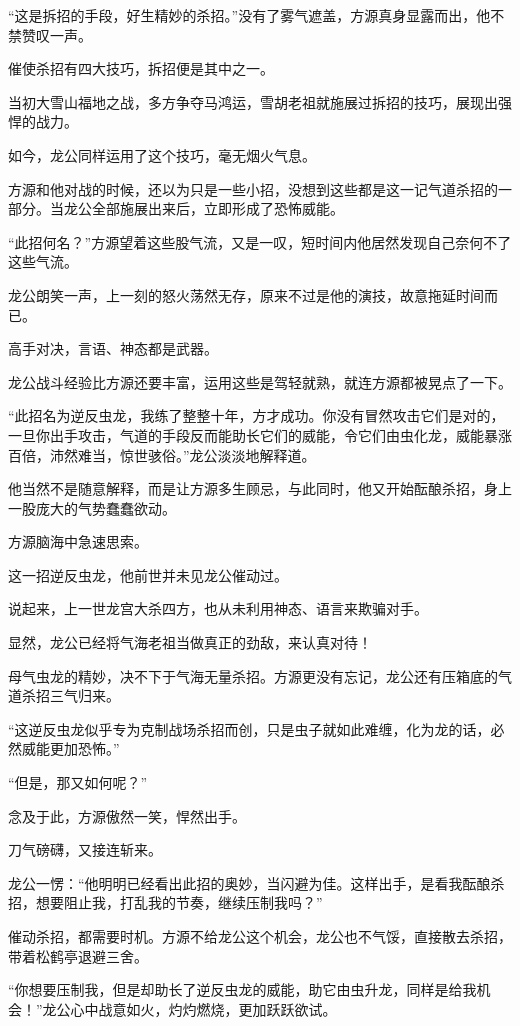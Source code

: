 \begin{this_body}
“这是拆招的手段，好生精妙的杀招。”没有了雾气遮盖，方源真身显露而出，他不禁赞叹一声。

催使杀招有四大技巧，拆招便是其中之一。

当初大雪山福地之战，多方争夺马鸿运，雪胡老祖就施展过拆招的技巧，展现出强悍的战力。

如今，龙公同样运用了这个技巧，毫无烟火气息。

方源和他对战的时候，还以为只是一些小招，没想到这些都是这一记气道杀招的一部分。当龙公全部施展出来后，立即形成了恐怖威能。

“此招何名？”方源望着这些股气流，又是一叹，短时间内他居然发现自己奈何不了这些气流。

龙公朗笑一声，上一刻的怒火荡然无存，原来不过是他的演技，故意拖延时间而已。

高手对决，言语、神态都是武器。

龙公战斗经验比方源还要丰富，运用这些是驾轻就熟，就连方源都被晃点了一下。

“此招名为逆反虫龙，我练了整整十年，方才成功。你没有冒然攻击它们是对的，一旦你出手攻击，气道的手段反而能助长它们的威能，令它们由虫化龙，威能暴涨百倍，沛然难当，惊世骇俗。”龙公淡淡地解释道。

他当然不是随意解释，而是让方源多生顾忌，与此同时，他又开始酝酿杀招，身上一股庞大的气势蠢蠢欲动。

方源脑海中急速思索。

这一招逆反虫龙，他前世并未见龙公催动过。

说起来，上一世龙宫大杀四方，也从未利用神态、语言来欺骗对手。

显然，龙公已经将气海老祖当做真正的劲敌，来认真对待！

母气虫龙的精妙，决不下于气海无量杀招。方源更没有忘记，龙公还有压箱底的气道杀招三气归来。

“这逆反虫龙似乎专为克制战场杀招而创，只是虫子就如此难缠，化为龙的话，必然威能更加恐怖。”

“但是，那又如何呢？”

念及于此，方源傲然一笑，悍然出手。

刀气磅礴，又接连斩来。

龙公一愣：“他明明已经看出此招的奥妙，当闪避为佳。这样出手，是看我酝酿杀招，想要阻止我，打乱我的节奏，继续压制我吗？”

催动杀招，都需要时机。方源不给龙公这个机会，龙公也不气馁，直接散去杀招，带着松鹤亭退避三舍。

“你想要压制我，但是却助长了逆反虫龙的威能，助它由虫升龙，同样是给我机会！”龙公心中战意如火，灼灼燃烧，更加跃跃欲试。


\end{this_body}
